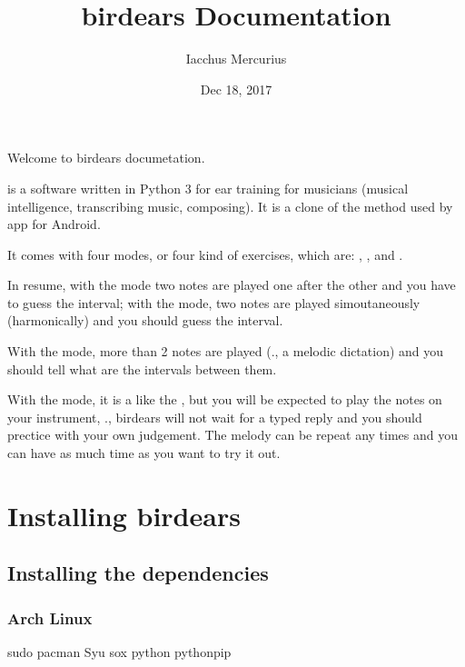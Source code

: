 \documentclass[letterpaper,10pt,english]{sphinxmanual}
\title{birdears Documentation}
\date{Dec 18, 2017}
\author{Iacchus Mercurius}
\begin{document}
\maketitle
\sphinxtableofcontents
{}\label{\detokenize{index::doc}}


Welcome to birdears documetation.

 is a software written in Python 3 for ear training for
musicians (musical intelligence, transcribing music, composing). It is a
clone of the method used by 
app for Android.

It comes with four modes, or four kind of exercises, which are:
, ,  and .

In resume, with the  mode two notes are played one after the
other and you have to guess the interval; with the  mode,
two notes are played simoutaneously (harmonically) and you should guess
the interval.

With the  mode, more than 2 notes are played (., a
melodic dictation) and you should tell what are the intervals between
them.

With the  mode, it is a like the , but you will
be expected to play the notes on your instrument, ., birdears will
not wait for a typed reply and you should prectice with your own
judgement. The melody can be repeat any times and you can have as much
time as you want to try it out.


\chapter{Installing birdears}
\label{\detokenize{installing:installing-birdears}}\label{\detokenize{installing:birdears-documentation}}\label{\detokenize{installing::doc}}

\section{Installing the dependencies}
\label{\detokenize{installing:installing-the-dependencies}}

\subsection{Arch Linux}
\label{\detokenize{installing:arch-linux}}
\begin{sphinxVerbatim}[commandchars=\\\{\}]
sudo pacman \PYGZhy{}Syu sox python python\PYGZhy{}pip
\end{sphinxVerbatim}
\end{document}

